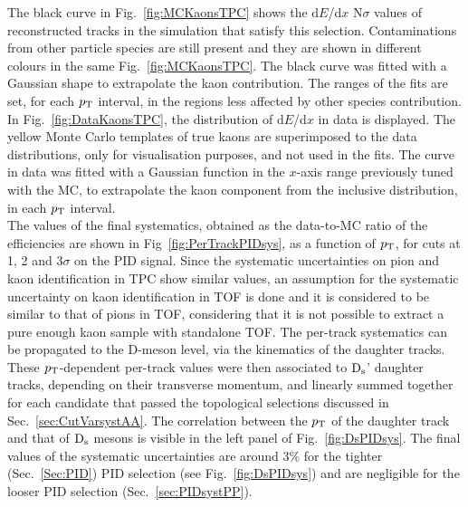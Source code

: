 The black curve in Fig.~\ref{fig:MCKaonsTPC} shows the d$E$/d$x$ 
N$\sigma$ values of reconstructed tracks in the simulation that satisfy this selection.
Contaminations from other particle species are still present and they
are shown in different colours in the same Fig.~\ref{fig:MCKaonsTPC}. 
The black curve was fitted with a Gaussian shape 
to extrapolate the kaon contribution. The ranges of the fits are set, for each $p_{\rm T}$ interval, in 
the regions less affected by other species contribution.
In Fig.~\ref{fig:DataKaonsTPC}, the distribution of d$E$/d$x$ in data is displayed. 
The yellow Monte Carlo templates of true 
kaons are superimposed to the data distributions, 
only for visualisation purposes, and not used in the fits. The curve in data
was fitted with a Gaussian function in the $x$-axis range previously tuned with the MC,
to extrapolate the kaon component from the inclusive distribution, in each $p_{\rm T}$ interval.\\
The values of the final systematics, obtained as the data-to-MC ratio
of the efficiencies are shown in Fig~\ref{fig:PerTrackPIDsys}, as a function of $p_{\rm T}$,
for cuts at 1, 2 and 3$\sigma$ on the PID signal. 
Since the systematic uncertainties on pion and kaon identification in 
TPC show similar values, an assumption for the systematic uncertainty 
on kaon identification in TOF is done and it is considered to be similar to that of pions in TOF,
considering that it is not possible to extract a pure enough kaon
sample with standalone TOF.
The per-track systematics can be propagated to the D-meson level, via the kinematics of
the daughter tracks.
These $p_{\rm T}$-dependent per-track values were then associated to
${\rm D_s}$' daughter tracks, depending on their transverse momentum, and linearly summed together 
for each candidate that passed the topological selections discussed 
in Sec.~\ref{sec:CutVarsystAA}. The correlation between the
$p_{\rm T}$ of the daughter track and that of ${\rm D_s}$ mesons is visible in the
left panel of Fig.~\ref{fig:DsPIDsys}.
The final values of the systematic uncertainties are around 
3\% for the tighter (Sec.~\ref{Sec:PID}) PID selection (see Fig.~\ref{fig:DsPIDsys}) and are negligible for the
looser PID selection (Sec.~\ref{sec:PIDsystPP}).

